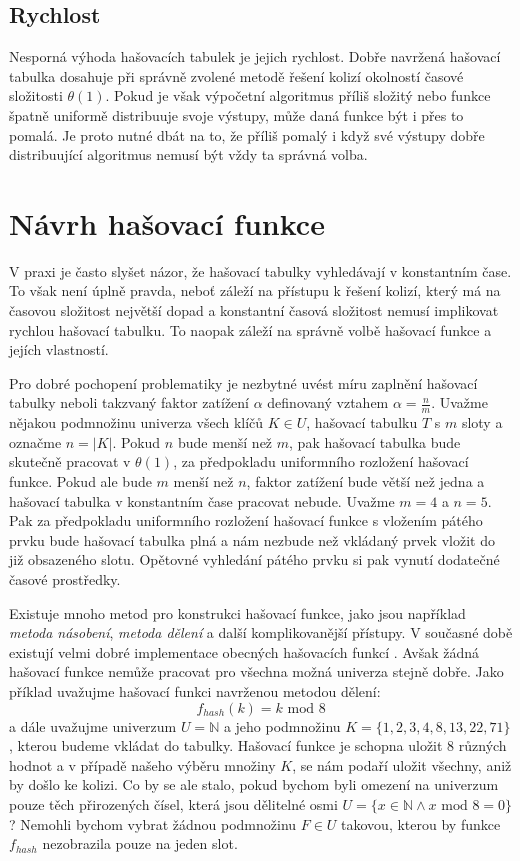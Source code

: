 \subsection{Rychlost}

Nesporná výhoda hašovacích tabulek je jejich rychlost. Dobře navržená hašovací
tabulka dosahuje při správně zvolené metodě řešení kolizí okolností časové složitosti $\theta (1)$. Pokud je však
výpočetní algoritmus příliš složitý nebo funkce špatně uniformě distribuuje svoje výstupy, může daná
funkce být i přes to pomalá. Je proto nutné dbát na to, že příliš pomalý i když své výstupy dobře distribuující
algoritmus nemusí být vždy ta správná volba.

\section{Návrh hašovací funkce}
\label{se:hash_function_design}

V praxi je často slyšet názor, že hašovací tabulky vyhledávají v konstantním čase.
To však není úplně pravda, neboť záleží na přístupu k řešení kolizí, který má na
časovou složitost největší dopad a konstantní časová složitost nemusí implikovat
rychlou hašovací tabulku. To naopak záleží na správně volbě hašovací funkce a
jejích vlastností.

Pro dobré pochopení problematiky je nezbytné uvést míru zaplnění hašovací tabulky
neboli takzvaný faktor zatížení $\alpha$ definovaný vztahem $\alpha = \frac{n}{m}$.
Uvažme nějakou podmnožinu univerza
všech klíčů $K \in U$, hašovací tabulku $T$ s $m$ sloty a označme $n = |K|$.
Pokud $n$ bude menší než $m$, pak hašovací tabulka bude skutečně pracovat v 
$\theta (1)$, za předpokladu uniformního rozložení hašovací funkce. Pokud ale
bude $m$ menší než $n$, faktor zatížení bude větší než jedna a hašovací tabulka
v konstantním čase pracovat nebude. Uvažme $m=4$ a $n=5$. Pak za předpokladu
uniformního rozložení hašovací funkce s vložením pátého prvku bude hašovací 
tabulka plná a nám nezbude než vkládaný prvek vložit do již obsazeného slotu.
Opětovné vyhledání pátého prvku si pak vynutí dodatečné časové prostředky.

Existuje mnoho metod pro konstrukci hašovací funkce, jako jsou například
\textit{metoda násobení}, \textit{metoda dělení} a další komplikovanější
přístupy. V současné době existují velmi dobré implementace obecných hašovacích funkcí 
\cite{murmurhash2,murmurhash3,cityhash_slides}.
Avšak žádná hašovací funkce nemůže pracovat pro všechna možná univerza stejně
dobře. Jako příklad uvažujme hašovací funkci navrženou metodou dělení:
$$ f_{hash}(k) = k \text{ mod } 8 $$ 
a dále uvažujme univerzum $U = \mathbb{N}$ a jeho
podmnožinu $K = \{1,2,3,4,8,13,22,71\}$, kterou budeme vkládat do tabulky.
Hašovací funkce je schopna uložit $8$ různých hodnot a v případě 
našeho výběru množiny $K$, se nám podaří uložit všechny, aniž by došlo ke kolizi.
Co by se ale stalo, pokud bychom byli omezení na univerzum pouze těch
přirozených čísel, která jsou dělitelné osmi $U = \{x \in \mathbb{N}
\land x \text{ mod } 8 = 0\}$? Nemohli bychom vybrat žádnou podmnožinu 
$F \in U$ takovou, kterou by funkce $f_{hash}$ nezobrazila pouze na jeden
slot.

